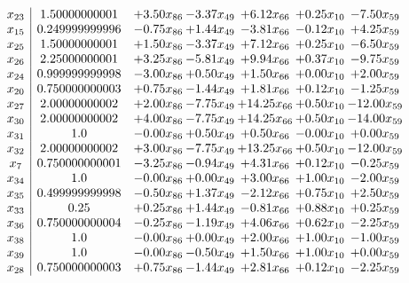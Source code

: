 \documentclass[8pt]{article}
\begin{document}
\[\begin{array}{c| c c@{\hskip 2pt} c@{\hskip 2pt} c@{\hskip 2pt} c@{\hskip 2pt} c@{\hskip 2pt} }
 x_{23}   &  1.50000000001 & +  3.50 x_{86} & -3.37 x_{49} & +  6.12 x_{66} & +  0.25 x_{10} & -7.50 x_{59}\\
 x_{15}   &  0.249999999996 & -0.75 x_{86} & +  1.44 x_{49} & -3.81 x_{66} & -0.12 x_{10} & +  4.25 x_{59}\\
 x_{25}   &  1.50000000001 & +  1.50 x_{86} & -3.37 x_{49} & +  7.12 x_{66} & +  0.25 x_{10} & -6.50 x_{59}\\
 x_{26}   &  2.25000000001 & +  3.25 x_{86} & -5.81 x_{49} & +  9.94 x_{66} & +  0.37 x_{10} & -9.75 x_{59}\\
 x_{24}   &  0.999999999998 & -3.00 x_{86} & +  0.50 x_{49} & +  1.50 x_{66} & +  0.00 x_{10} & +  2.00 x_{59}\\
 x_{20}   &  0.750000000003 & +  0.75 x_{86} & -1.44 x_{49} & +  1.81 x_{66} & +  0.12 x_{10} & -1.25 x_{59}\\
 x_{27}   &  2.00000000002 & +  2.00 x_{86} & -7.75 x_{49} & + 14.25 x_{66} & +  0.50 x_{10} & -12.00 x_{59}\\
 x_{30}   &  2.00000000002 & +  4.00 x_{86} & -7.75 x_{49} & + 14.25 x_{66} & +  0.50 x_{10} & -14.00 x_{59}\\
 x_{31}   &  1.0 & -0.00 x_{86} & +  0.50 x_{49} & +  0.50 x_{66} & -0.00 x_{10} & +  0.00 x_{59}\\
 x_{32}   &  2.00000000002 & +  3.00 x_{86} & -7.75 x_{49} & + 13.25 x_{66} & +  0.50 x_{10} & -12.00 x_{59}\\
 x_{7}   &  0.750000000001 & -3.25 x_{86} & -0.94 x_{49} & +  4.31 x_{66} & +  0.12 x_{10} & -0.25 x_{59}\\
 x_{34}   &  1.0 & -0.00 x_{86} & +  0.00 x_{49} & +  3.00 x_{66} & +  1.00 x_{10} & -2.00 x_{59}\\
 x_{35}   &  0.499999999998 & -0.50 x_{86} & +  1.37 x_{49} & -2.12 x_{66} & +  0.75 x_{10} & +  2.50 x_{59}\\
 x_{33}   &  0.25 & +  0.25 x_{86} & +  1.44 x_{49} & -0.81 x_{66} & +  0.88 x_{10} & +  0.25 x_{59}\\
 x_{36}   &  0.750000000004 & -0.25 x_{86} & -1.19 x_{49} & +  4.06 x_{66} & +  0.62 x_{10} & -2.25 x_{59}\\
 x_{38}   &  1.0 & -0.00 x_{86} & +  0.00 x_{49} & +  2.00 x_{66} & +  1.00 x_{10} & -1.00 x_{59}\\
 x_{39}   &  1.0 & -0.00 x_{86} & -0.50 x_{49} & +  1.50 x_{66} & +  1.00 x_{10} & +  0.00 x_{59}\\
 x_{28}   &  0.750000000003 & +  0.75 x_{86} & -1.44 x_{49} & +  2.81 x_{66} & +  0.12 x_{10} & -2.25 x_{59}\\

\end{array}\]
\end{document}
